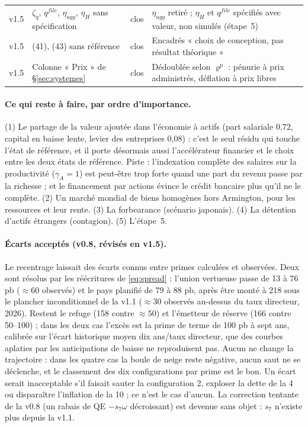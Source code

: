 \documentclass[11pt,a4paper]{article}
\begin{document}
\begin{center}
\begin{longtable}{p{0.9cm}p{4.6cm}p{1.3cm}p{7.6cm}}
v1.5 & $\zeta_q$, $q^{file}$, $\eta_{agg}$, $\eta_H$ sans spécification & clos & $\eta_{agg}$ retiré ; $\eta_H$ et $q^{file}$ spécifiés avec valeur, non simulés (étape~5)\\
v1.5 & (41), (43) sans référence & clos & Encadrés « choix de conception, pas résultat théorique »\\
v1.5 & Colonne « Prix » de \S\ref{sec:systemes} & clos & Dédoublée selon $\varrho^p$ : pénurie à prix administrés, déflation à prix libres\\
\bottomrule
\end{longtable}
\end{center}
\paragraph{Ce qui reste à faire, par ordre d'importance.} (1) Le partage de la valeur ajoutée dans l'économie à actifs (part salariale 0,72, capital en baisse lente, levier des entreprises 0,08) : c'est le seul résidu qui touche l'état de référence, et il porte désormais aussi l'accélérateur financier et le choix entre les deux états de référence. Piste : l'indexation complète des salaires sur la productivité ($\gamma_A=1$) est peut-être trop forte quand une part du revenu passe par la richesse ; et le financement par actions évince le crédit bancaire plus qu'il ne le complète. (2) Un marché mondial de biens homogènes hors Armington, pour les ressources et leur rente. (3) La forbearance (scénario japonais). (4) La détention d'actifs étrangers (contagion). (5) L'étape~5.

\paragraph{Écarts acceptés (v0.8, révisés en v1.5).} Le recentrage laissait des écarts connus entre primes calculées et observées. Deux sont résolus par les réécritures de \eqref{eq:spread} : l'union vertueuse passe de 13 à 76 pb ($\approx60$ observés) et le pays planifié de 79 à 88 pb, après être monté à 218 sous le plancher inconditionnel de la v1.1 ($\approx30$ observés au-dessus du taux directeur, 2026). Restent le refuge (158 contre $\approx50$) et l'émetteur de réserve (166 contre 50--100) ; dans les deux cas l'excès est la prime de terme de 100 pb à sept ans, calibrée sur l'écart historique moyen dix ans/taux directeur, que des courbes aplaties par les anticipations de baisse ne reproduisent pas. Aucun ne change la trajectoire : dans les quatre cas la boule de neige reste négative, aucun saut ne se déclenche, et le classement des dix configurations par prime est le bon. Un écart serait inacceptable s'il faisait sauter la configuration 2, exploser la dette de la 4 ou disparaître l'inflation de la 10 ; ce n'est le cas d'aucun. La correction tentante de la v0.8 (un rabais de QE $-s_7\omega$ décroissant) est devenue sans objet : $s_7$ n'existe plus depuis la v1.1.
\end{document}
